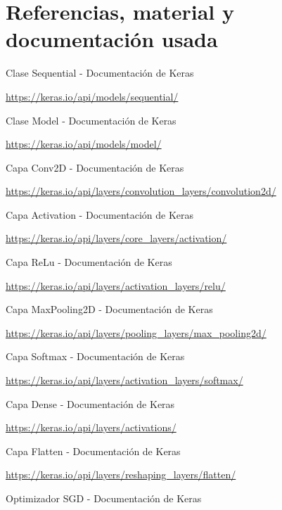 \documentclass[12pt, spanish]{article}
\begin{document}
\newpage

\section{Referencias, material y documentación usada}


\begin{thebibliography}{9}

	Clase Sequential - Documentación de Keras

	\url{https://keras.io/api/models/sequential/}



	Clase Model - Documentación de Keras

	\url{https://keras.io/api/models/model/}


	Capa Conv2D - Documentación de Keras

	\url{https://keras.io/api/layers/convolution_layers/convolution2d/}



	Capa Activation - Documentación de Keras

	\url{https://keras.io/api/layers/core_layers/activation/}


	Capa ReLu - Documentación de Keras

	\url{https://keras.io/api/layers/activation_layers/relu/}


	Capa MaxPooling2D - Documentación de Keras

	\url{https://keras.io/api/layers/pooling_layers/max_pooling2d/}


	Capa Softmax - Documentación de Keras

	\url{https://keras.io/api/layers/activation_layers/softmax/}


	Capa Dense - Documentación de Keras

	\url{https://keras.io/api/layers/activations/}


	Capa Flatten - Documentación de Keras

	\url{https://keras.io/api/layers/reshaping_layers/flatten/}


	Optimizador SGD - Documentación de Keras


\end{thebibliography}
\end{document}
